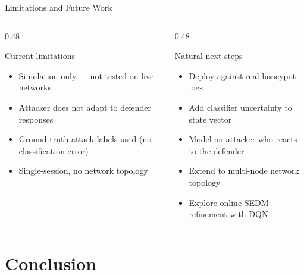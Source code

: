 \documentclass[aspectratio=169, 12pt]{beamer}
\begin{document}
\begin{frame}{Limitations and Future Work}
  \begin{columns}[T]
    \begin{column}{0.48\textwidth}
      \begin{alertblock}{Current limitations}
        \begin{itemize}
          \item Simulation only — not tested on live networks
          \item Attacker does not adapt to defender responses
          \item Ground-truth attack labels used (no classification error)
          \item Single-session, no network topology
        \end{itemize}
      \end{alertblock}
    \end{column}
    \begin{column}{0.48\textwidth}
      \begin{exampleblock}{Natural next steps}
        \begin{itemize}
          \item Deploy against real honeypot logs
          \item Add classifier uncertainty to state vector
          \item Model an attacker who reacts to the defender
          \item Extend to multi-node network topology
          \item Explore online SEDM refinement with DQN
        \end{itemize}
      \end{exampleblock}
    \end{column}
  \end{columns}
\end{frame}

\section{Conclusion}
\end{document}
